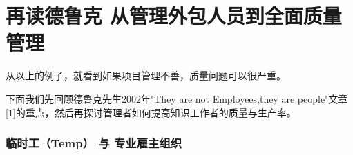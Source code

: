 \chapter{再读德鲁克 从管理外包人员到全面质量管理} %


从以上的例子，就看到如果项目管理不善，质量问题可以很严重。

下面我们先回顾德鲁克先生2002年"They are not Employees,they are
people"文章{[}1{]}的重点，然后再探讨管理者如何提高知识工作者的质量与生产率。

\hypertarget{ux4e34ux65f6ux5de5temp-ux4e0e-ux4e13ux4e1aux96c7ux4e3bux7ec4ux7ec7}{%
\subsection{临时工（Temp） 与
专业雇主组织}\label{ux4e34ux65f6ux5de5temp-ux4e0e-ux4e13ux4e1aux96c7ux4e3bux7ec4ux7ec7}}


